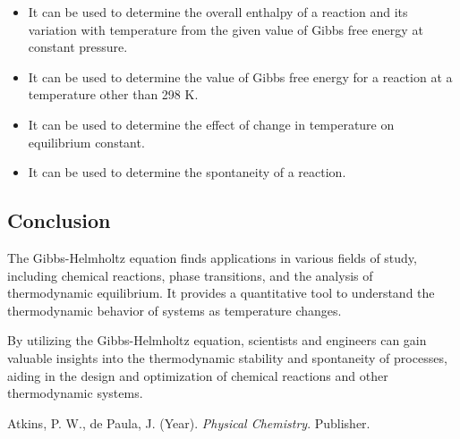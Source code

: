 \documentclass{article}
\begin{document}
\begin{itemize}

  \item It can be used to determine the overall enthalpy of a reaction and its variation with temperature from the given value of Gibbs free energy at constant pressure.
  \item It can be used to determine the value of Gibbs free energy for a reaction at a temperature other than 298 K.
  \item It can be used to determine the effect of change in temperature on equilibrium constant.
  \item It can be used to determine the spontaneity of a reaction.

\end{itemize}

\subsection{Conclusion}
The Gibbs-Helmholtz equation finds applications in various fields of study, including chemical reactions, phase transitions, and the analysis of thermodynamic equilibrium. It provides a quantitative tool to understand the thermodynamic behavior of systems as temperature changes.


By utilizing the Gibbs-Helmholtz equation, scientists and engineers can gain valuable insights into the thermodynamic stability and spontaneity of processes, aiding in the design and optimization of chemical reactions and other thermodynamic systems.

\begin{thebibliography}{1}
 Atkins, P. W., de Paula, J. (Year). \textit{Physical Chemistry}. Publisher.
\end{thebibliography}
\end{document}
